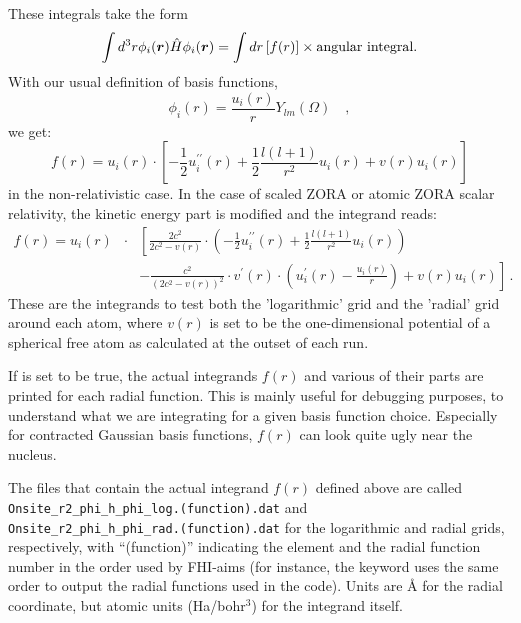 These integrals take the form 
\begin{equation}
 \int d^3r \phi_{i}(\mbox{\boldmath$r$}) \hat{H} \phi_{i}(\mbox{\boldmath$r$}) = \int dr
 \left[ f(r) \right] \times \text{angular integral} .
\end{equation}
With our usual definition of basis functions,
\begin{equation}
  \phi_i(r) = \frac{u_i(r)}{r} Y_{lm}(\Omega) \quad ,
\end{equation}
we get:
\begin{equation}
  f(r) = u_i(r) \cdot \left[ -\frac{1}{2} u_i^{\prime\prime}(r) +
    \frac{1}{2} \frac{l(l+1)}{r^2} u_i(r) + v(r)u_i(r) \right]
\end{equation}
in the non-relativistic case. In the case of scaled ZORA or atomic
ZORA scalar relativity, the kinetic energy part is modified and the
integrand reads:
\begin{eqnarray}
  f(r) = u_i(r) & \cdot & \left [
     \frac{2 c^2}{2
      c^2 - v(r)} \cdot \left( -\frac{1}{2} u_i^{\prime\prime}(r) +
    \frac{1}{2} \frac{l(l+1)}{r^2} u_i(r) \right)  \right. \\ \nonumber
    & \, & \left. - \frac{c^2}{(2 c^2 - v(r))^2} \cdot v^\prime(r)
    \cdot \left(u_i^\prime(r) - \frac{u_i(r)}{r} \right) + v(r)u_i(r) \right] \, .
\end{eqnarray}
These are the integrands to test both the 'logarithmic' grid and the
'radial' grid around each atom, where $v(r)$ is set to be the
one-dimensional potential of a spherical free atom as calculated at
the outset of each run.

If   is set to
be true, the actual integrands $f(r)$ and various of their parts are
printed for each radial function. This is mainly useful for debugging
purposes, to understand what we are integrating for a given basis
function choice. Especially for contracted Gaussian basis functions,
$f(r)$ can look quite ugly near the nucleus. 

The files that contain the actual integrand $f(r)$ defined above are
called \\
\texttt{Onsite\_r2\_phi\_h\_phi\_log.(function).dat} and \\
\texttt{Onsite\_r2\_phi\_h\_phi\_rad.(function).dat} for the logarithmic and
radial grids, respectively, with ``(function)'' indicating the element
and the radial function number in the order used by FHI-aims (for
instance, the   keyword uses
the same order to output the radial functions used in the code). Units
are {\AA} for the radial coordinate, but atomic units (Ha/bohr$^3$)
for the integrand itself.

